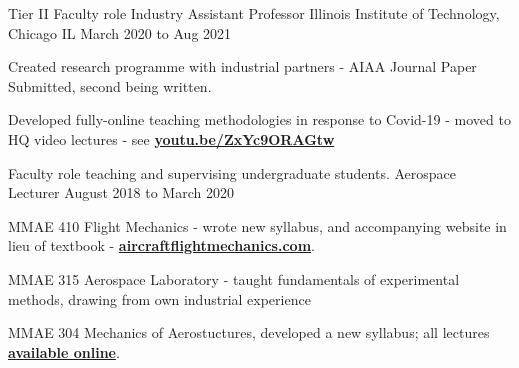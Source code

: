 \begin{cventries}
 \cventry
    {Tier II Faculty role} %
    {Industry Assistant Professor} %
    {Illinois Institute of Technology, Chicago IL} %
    {March 2020 to Aug 2021} %
    {%
    \begin{cvitems}
    	\item Created research programme with industrial partners - AIAA Journal Paper Submitted, second being written.
    	\item Developed fully-online teaching methodologies in response to Covid-19 - moved to HQ video lectures - see \textcolor{cyan}{\textbf{\href{https://youtu.be/ZxYc9ORAGtw}{youtu.be/ZxYc9ORAGtw}}}
    \end{cvitems}
    }
  \cventry
    {Faculty role teaching and supervising undergraduate students.} %
    {Aerospace Lecturer} %
    {\hspace{-3cm}} %
    {August 2018 to March 2020} %
    {%
    \begin{cvitems}
    	\item MMAE 410 Flight Mechanics - wrote new syllabus, and accompanying website in lieu of textbook - \textcolor{cyan}{\textbf{\href{www.aircraftflightmechanics.com}{aircraftflightmechanics.com}}}.
    	\item MMAE 315 Aerospace Laboratory - taught fundamentals of experimental methods, drawing from own industrial experience
    	\item MMAE 304 Mechanics of Aerostuctures, developed a new syllabus; all lectures \textcolor{cyan}{\textbf{\href{https://www.youtube.com/watch?v=XaKwlHxDsKE&list=PLVyHCaFIZQV_Fnchp_8yxVAGedKU8rDGZ}{available online}}}.
    \end{cvitems}
    \hspace{-.5cm}%
    }
    

  
  \setlength{\itemsep}{10pt}


    
    


\end{cventries}
